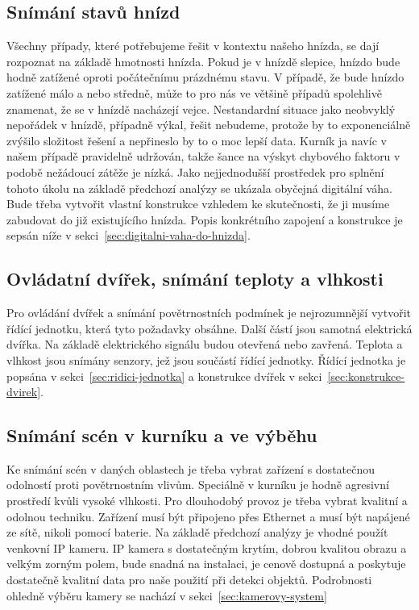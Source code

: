 \subsection{Snímání stavů hnízd}
Všechny případy, které potřebujeme řešit v kontextu našeho hnízda, se dají rozpoznat na základě hmotnosti hnízda.
Pokud je v hnízdě slepice, hnízdo bude hodně zatížené oproti počátečnímu prázdnému stavu.
V případě, že bude hnízdo zatížené málo a nebo středně, může to pro nás ve většině případů spolehlivě znamenat, že se v hnízdě nacházejí vejce.
Nestandardní situace jako neobvyklý nepořádek v hnízdě, případně výkal, řešit nebudeme, protože by to exponenciálně zvýšilo složitost řešení a nepřineslo by to o moc lepší data.
Kurník ja navíc v našem případě pravidelně udržován, takže šance na výskyt chybového faktoru v podobě nežádoucí zátěže je nízká.
Jako nejjednodušší prostředek pro splnění tohoto úkolu na základě předchozí analýzy se ukázala obyčejná digitální váha.
Bude třeba vytvořit vlastní konstrukce vzhledem ke skutečnosti, že ji musíme zabudovat do již existujícího hnízda.
Popis konkrétního zapojení a konstrukce je sepsán níže v sekci~\ref{sec:digitalni-vaha-do-hnizda}.

\subsection{Ovládatní dvířek, snímání teploty a vlhkosti}
Pro ovládání dvířek a snímání povětrnostních podmínek je nejrozumnější vytvořit řídící jednotku, která tyto požadavky obsáhne.
Další částí jsou samotná elektrická dvířka. Na základě elektrického signálu budou otevřená nebo zavřená.
Teplota a vlhkost jsou snímány senzory, jež jsou součástí řídící jednotky.
Řídící jednotka je popsána v sekci~\ref{sec:ridici-jednotka} a konstrukce dvířek v sekci~\ref{sec:konstrukce-dvirek}.

\subsection{Snímání scén v kurníku a ve výběhu}
Ke snímání scén v daných oblastech je třeba vybrat zařízení s dostatečnou odolností proti povětrnostním vlivům.
Speciálně v kurníku je hodně agresivní prostředí kvůli vysoké vlhkosti. Pro dlouhodobý provoz je třeba vybrat kvalitní a odolnou techniku.
Zařízení musí být připojeno přes Ethernet a musí být napájené ze sítě, nikoli pomocí baterie.
Na základě předchozí analýzy je vhodné použít venkovní IP kameru.
IP kamera s dostatečným krytím, dobrou kvalitou obrazu a velkým zorným polem, bude snadná na instalaci, je cenově dostupná a poskytuje dostatečně kvalitní data pro naše použití při detekci objektů.
Podrobnosti ohledně výběru kamery se nachází v sekci~\ref{sec:kamerovy-system}

